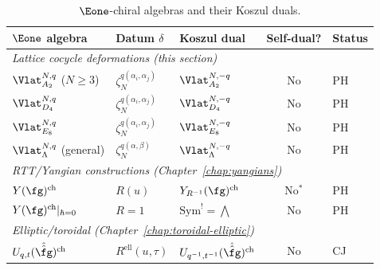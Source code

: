 \begin{table}[ht]
\centering
\caption{$\Eone$-chiral algebras and their Koszul duals.}
\label{tab:lattice:e1-catalog}
\renewcommand{\arraystretch}{1.4}
{\small
\begin{tabular}{l l l c l}
\textbf{$\Eone$ algebra} & \textbf{Datum $\delta$}
 & \textbf{Koszul dual}
 & \textbf{Self-dual?}
 & \textbf{Status} \\
\hline
\multicolumn{5}{l}{\textit{Lattice cocycle deformations
 \textup{(}this section\textup{)}}} \\
\hline
$\Vlat_{A_2}^{N,q}$ ($N \geq 3$)
 & $\zeta_N^{q(\alpha_i,\alpha_j)}$
 & $\Vlat_{A_2}^{N,-q}$
 & No & PH \\
$\Vlat_{D_4}^{N,q}$
 & $\zeta_N^{q(\alpha_i,\alpha_j)}$
 & $\Vlat_{D_4}^{N,-q}$
 & No & PH \\
$\Vlat_{E_8}^{N,q}$
 & $\zeta_N^{q(\alpha_i,\alpha_j)}$
 & $\Vlat_{E_8}^{N,-q}$
 & No & PH \\
$\Vlat_\Lambda^{N,q}$ (general)
 & $\zeta_N^{q(\alpha,\beta)}$
 & $\Vlat_\Lambda^{N,-q}$
 & No & PH \\
\hline
\multicolumn{5}{l}{\textit{RTT/Yangian constructions
 \textup{(}Chapter~\ref{chap:yangians}\textup{)}}} \\
\hline
$Y(\fg)^{\mathrm{ch}}$
 & $R(u)$
 & $Y_{R^{-1}}(\fg)^{\mathrm{ch}}$
 & No$^*$ & PH \\
$Y(\fg)^{\mathrm{ch}}|_{\hbar=0}$
 & $R = 1$
 & $\mathrm{Sym}^! = \bigwedge$
 & No & PH \\
\hline
\multicolumn{5}{l}{\textit{Elliptic/toroidal
 \textup{(}Chapter~\ref{chap:toroidal-elliptic}\textup{)}}} \\
\hline
$U_{q,t}(\hat{\hat{\fg}})^{\mathrm{ch}}$
 & $R^{\mathrm{ell}}(u,\tau)$
 & $U_{q^{-1},t^{-1}}(\hat{\hat{\fg}})^{\mathrm{ch}}$
 & No & CJ \\
\end{tabular}
}
\smallskip

\end{table}

